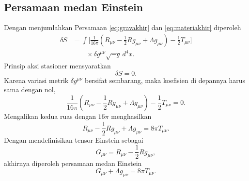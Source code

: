 \subsection*{Persamaan medan Einstein}
Dengan menjumlahkan Persamaan \eqref{eq:gravakhir} dan \eqref{eq:materiakhir} diperoleh
\begin{align} \delta S &= \int \Bigg[ \frac{1}{16\pi} \left( R_{\mu\nu} - \frac12Rg_{\mu\nu} + \Lambda g_{\mu\nu} \right) - \frac12 T_{\mu\nu} \Bigg] \nonumber\\ &\qquad\times \delta g^{\mu\nu} \sqrt{-g} \,d^4x. \end{align}
Prinsip aksi stasioner mensyaratkan
\begin{equation} \delta S=0. \end{equation}
Karena variasi metrik $\delta g^{\mu\nu}$ bersifat sembarang, maka koefisien di depannya harus sama dengan nol,
\begin{equation} \frac{1}{16\pi} \left( R_{\mu\nu} - \frac12Rg_{\mu\nu} + \Lambda g_{\mu\nu} \right) - \frac12 T_{\mu\nu} =0. \end{equation}
Mengalikan kedua ruas dengan $16\pi$ menghasilkan
\begin{equation} R_{\mu\nu} - \frac12 Rg_{\mu\nu} + \Lambda g_{\mu\nu} = 8\pi T_{\mu\nu}. \end{equation}
Dengan mendefinisikan tensor Einstein sebagai
\begin{equation} G_{\mu\nu} = R_{\mu\nu} - \frac12 Rg_{\mu\nu}, \end{equation}
akhirnya diperoleh persamaan medan Einstein
\begin{equation} G_{\mu\nu} + \Lambda g_{\mu\nu} = 8\pi T_{\mu\nu}. \end{equation}